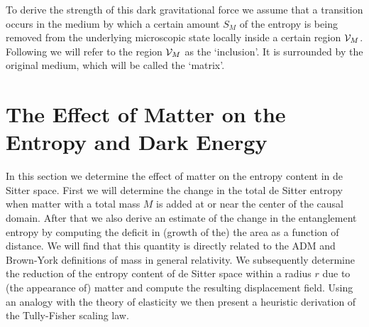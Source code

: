 \documentclass[a4paper,12pt]{article}
\begin{document}
To derive the strength of this dark gravitational force  we assume that a transition occurs in the 
medium by which a certain amount $S_M$ of 
the entropy is being removed from the underlying 
microscopic state locally inside 
a certain region ${\cal V}_M$. 
Following \cite{Eshelby} we will refer to the region  ${\cal V}_M$ 
as the `inclusion'.  It is surrounded by the original medium, which will be called the 
`matrix'. 





\section{The Effect of Matter on the Entropy and Dark Energy}


In this section we determine the effect of matter on the entropy content in de Sitter space. First we will determine the change in the total de Sitter entropy when matter with a total mass $M$ is added at or near the center of the causal domain. After that we also derive an estimate of the change in the entanglement entropy by computing the deficit in (growth of the) the area as a function of distance.  We will find that this quantity is directly related to the ADM and Brown-York definitions of mass in general relativity. We subsequently determine the reduction of the entropy content of de Sitter space within a radius $r$ due to (the appearance of) matter and compute the resulting displacement field. Using an analogy with the theory of elasticity we then present a heuristic derivation of the Tully-Fisher scaling law. 

\end{document}
